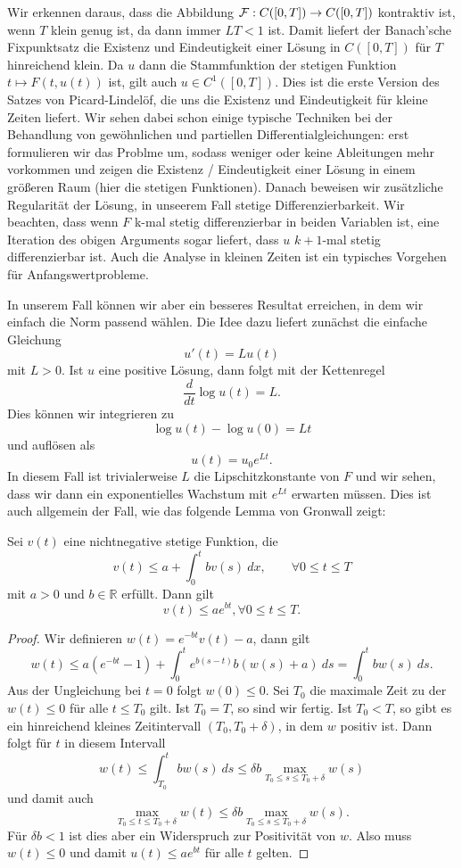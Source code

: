 Wir erkennen daraus, dass die Abbildung ${\cal F}:C([0,T]) \rightarrow C([0,T])$ kontraktiv ist, wenn $T$ klein genug ist, da dann immer $L T < 1 $ ist. Damit liefert der Banach'sche Fixpunktsatz die Existenz und Eindeutigkeit einer Lösung in $C([0,T])$ für $T$ hinreichend klein. Da $u$ dann die Stammfunktion der stetigen Funktion $t \mapsto F(t,u(t))$ ist, gilt auch $u \in C^1([0,T])$.  Dies ist die erste Version des Satzes von Picard-Lindelöf, die uns die Existenz und Eindeutigkeit für kleine Zeiten liefert. Wir sehen dabei schon einige typische Techniken bei der Behandlung von gewöhnlichen und partiellen Differentialgleichungen: erst formulieren wir das Problme um, sodass weniger oder keine Ableitungen mehr vorkommen und zeigen die Existenz / Eindeutigkeit einer Lösung in einem gr{ö}{\ss}eren Raum (hier die stetigen Funktionen). Danach beweisen wir zusätzliche Regularität der Lösung, in unseerem Fall stetige Differenzierbarkeit. Wir beachten, dass wenn $F$ k-mal stetig differenzierbar in beiden Variablen ist, eine Iteration des obigen Arguments sogar liefert, dass $u$ $k+1$-mal stetig differenzierbar ist. Auch die Analyse in kleinen Zeiten ist ein typisches Vorgehen für Anfangswertprobleme. 

In unserem Fall können wir aber ein besseres Resultat erreichen, in dem wir einfach die Norm passend wählen. Die Idee dazu liefert zunächst die einfache Gleichung
$$ u'(t) = L u(t) $$
mit $L > 0$. Ist $u$ eine positive Lösung, dann folgt mit der Kettenregel
$$ \frac{d}{dt} \log u(t) = L. $$
Dies können wir integrieren zu 
$$ \log u(t) - \log u(0) = L t $$
und auflösen als 
$$ u(t) = u_0 e^{Lt}. $$
In diesem Fall ist trivialerweise $L$ die Lipschitzkonstante von $F$ und wir sehen, dass wir dann ein exponentielles Wachstum mit $e^{Lt}$ erwarten müssen. Dies ist auch allgemein der Fall, wie das folgende Lemma von Gronwall zeigt:
 
\begin{lemma}{}{}
Sei $v(t)$ eine nichtnegative stetige Funktion, die 
$$ v(t) \leq a + \int_0^t b v(s)~dx, \qquad \forall 0 \leq t \leq T$$
mit $a > 0$ und $b \in \mathbb{R}$ erfüllt. Dann gilt 
$$ v(t) \leq a e^{bt}, \forall 0 \leq t \leq T.$$
\end{lemma}

\begin{proof}
Wir definieren $w(t) = e^{-bt} v(t) - a$, dann gilt 
$$ w(t) \leq a (e^{-bt}-1)+ \int_0^t e^{b(s-t)} b (w(s)+a)~ds = \int_0^t b w(s)~ds. $$
Aus der Ungleichung bei $t=0$ folgt $w(0) \leq 0$. Sei $T_0$ die maximale Zeit zu der $w(t) \leq 0$ für alle $t \leq T_0$ gilt. Ist $T_0=T$, so sind wir fertig. Ist $T_0 < T$, so gibt es ein hinreichend kleines Zeitintervall $(T_0,T_0+\delta)$, in dem $w$ positiv ist. Dann folgt für $t$ in diesem Intervall
$$ w(t) \leq \int_{T_0}^t b w(s) ~ds \leq \delta b \max_{T_0 \leq s \leq T_0 + \delta} w(s) $$ 
und damit auch 
$$   \max_{T_0 \leq t \leq T_0 + \delta} w(t)  \leq \delta b \max_{T_0 \leq s \leq T_0 + \delta} w(s) . $$
Für $\delta b < 1$ ist dies aber ein Widerspruch zur Positivität von $w$. Also muss $w(t) \leq 0$ und damit $u(t) \leq a e^{bt}$ für alle $t$ gelten.
\end{proof}

